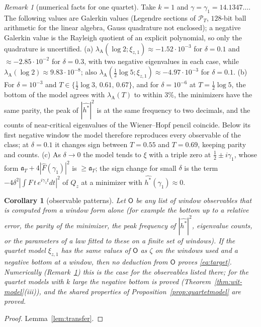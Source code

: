 \documentclass[11pt]{amsart}
\newtheorem{corollary}[theorem]{Corollary}
\theoremstyle{definition}
\theoremstyle{remark}
\newtheorem{remark}[theorem]{Remark}
\newcommand{\PT}{\mathcal P_T}
\newcommand{\lamA}{\lambda_{\mathrm A}(T)}
\newcommand{\Fh}{\widehat F}
\begin{document}
\begin{remark}[numerical facts for one quartet]\label{rem:quartetnum}
Take $k=1$ and $\gamma=\gamma_1=14.1347\ldots$. The following values are Galerkin values (Legendre sections of
$\PT$, $128$-bit ball arithmetic for the linear algebra, Gauss quadrature not enclosed); a negative Galerkin
value is the Rayleigh quotient of an explicit polynomial, so only the quadrature is uncertified.
(a) $\lambda_{\mathrm A}(\log2;\xi_{z,1})\approx-1.52\cdot10^{-3}$ for $\delta=0.1$ and $\approx-2.85\cdot10^{-2}$ for
$\delta=0.3$, with two negative eigenvalues in each case, while $\lambda_{\mathrm A}(\log2)\approx9.83\cdot10^{-8}$;
also $\lambda_{\mathrm A}(\frac12\log5;\xi_{z,1})\approx-4.97\cdot10^{-3}$ for $\delta=0.1$.
(b) For $\delta=10^{-3}$ and $T\in\{\frac12\log3,\,0.61,\,0.67\}$, and for $\delta=10^{-6}$ at $T=\frac12\log5$, the
bottom of the model agrees with $\lamA$ to within $3\%$, the minimizers have the same parity, the peak of
$|\widehat{h^*}|^2$ is at the same frequency to two decimals, and the counts of near-critical eigenvalues of the
Wiener--Hopf pencil coincide. Below its first negative window the model therefore reproduces every observable
of the class; at $\delta=0.1$ it changes sign between $T=0.55$ and $T=0.69$, keeping parity and counts.
(c) As $\delta\to0$ the model tends to $\xi$ with a triple zero at $\frac12\pm i\gamma_1$, whose form
$\mathfrak a_T+4|\Fh(\gamma_1)|^2$ is $\ge\mathfrak a_T$; the sign change for small $\delta$ is the term
$-4\delta^2|\int F\,t\,e^{i\gamma_1t}dt|^2$ of $Q_z$ at a minimizer with $\widehat{h^*}(\gamma_1)\approx0$.
\end{remark}

\begin{corollary}[observable patterns]\label{cor:pattern}
Let $\mathsf O$ be any list of window observables that is computed from a window form alone (for example the
bottom up to a relative error, the parity of the minimizer, the peak frequency of $|\widehat{h^*}|^2$, eigenvalue
counts, or the parameters of a law fitted to these on a finite set of windows). If the quartet model $\xi_{z,1}$
has the same values of $\mathsf O$ as $\zeta$ on the windows used and a negative bottom at a window, then no
deduction from $\mathsf O$ proves \eqref{eq:target}. Numerically (Remark~\ref{rem:quartetnum}) this is the case for
the observables listed there; for the quartet models with $k$ large the negative bottom is proved
(Theorem~\ref{thm:wit-model}(iii)), and the shared properties of Proposition~\ref{prop:quartetmodel} are proved.
\end{corollary}
\begin{proof}
Lemma~\ref{lem:transfer}.
\end{proof}
\end{document}
